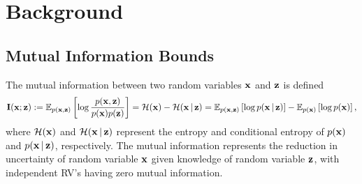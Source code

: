 \newcommand{\joint}{{p(\vx, \vz)}}
\newcommand{\px}{{p(\vx)}}
\newcommand{\pz}{{p(\vz)}}
\newcommand{\pxgivenz}{{p(\vx|\vz)}}
\newcommand{\pzx}{{p_{\theta}(\vz| \vx)}}
\newcommand{\qzx}{{q_{\phi}(\vz|\vx)}}

\newcommand{\prop}{q_{\text{prop}}}
\newcommand{\tprop}{\tilde{q}_{\text{prop}}}
\newcommand{\Zprop}{ \mathcal{Z}_{\text{prop}}}
\newcommand{\tgt}{p_{\text{tgt}}}
\newcommand{\ttgt}{\tilde{p}_{\text{tgt}}}
\newcommand{\Ztgt}{ \mathcal{Z}_{\text{tgt}}}
\newcommand{\kl}{{\text{KL}}}




\section{Background}
\label{background}
\subsection{Mutual Information Bounds}

The mutual information between two random variables $\operatorname{\mathbf{x}}$ and $\operatorname{\mathbf{z}}$ is defined 
\begin{align}
\label{eq:MI}
    \mathbf{I}(\vx ; \vz) := \E_{\joint}\left[\log \frac{\joint}{\px \pz}\right] = \mathcal{H}(\vx) - \mathcal{H}(\vx|\vz) = \E_{\joint}\left[\log \pxgivenz\right] - \E_{\px} \left[\log \px\right],
\end{align}
where $\mathcal{H}(\operatorname{\mathbf{x}})$ and $\mathcal{H}(\operatorname{\mathbf{x}}|\operatorname{\mathbf{z}})$ represent the entropy and conditional entropy of $\px$ and $\pxgivenz$, respectively. The mutual information represents the reduction in uncertainty of random variable $\operatorname{\mathbf{x}}$ given knowledge of random variable $\operatorname{\mathbf{z}}$, with independent RV's having zero mutual information.

